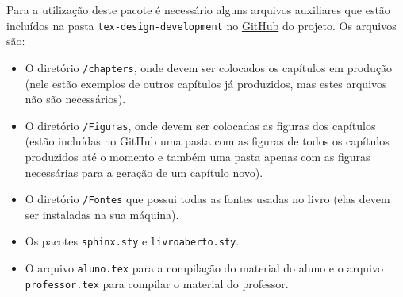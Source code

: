 






Para a utilização deste pacote é necessário alguns arquivos auxiliares que estão incluídos na pasta \verb|tex-design-development| no \href{https://github.com/livro-aberto/tex-design-development/}{GitHub} do projeto. Os arquivos são:
\begin{itemize}
\item O diretório \verb|/chapters|, onde devem ser colocados os capítulos em produção (nele estão exemplos de outros capítulos já produzidos, mas estes arquivos não são necessários).
\item O diretório \verb|/Figuras|, onde devem ser colocadas as figuras dos capítulos (estão incluídas no GitHub uma pasta com as figuras de todos os capítulos produzidos até o momento e também uma pasta apenas com as figuras necessárias para a geração de um capítulo novo).
\item O diretório \verb|/Fontes| que possui todas as fontes usadas no livro (elas devem ser instaladas na sua máquina).
\item Os pacotes \verb|sphinx.sty| e \verb|livroaberto.sty|.
\item O arquivo \verb|aluno.tex| para a compilação do material do aluno e o arquivo \verb|professor.tex| para compilar o material do professor.
\end{itemize}

